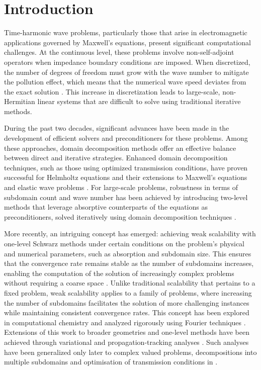 \documentclass[smallextended]{svjour3}       %
\begin{document}
\maketitle

\section{Introduction}
Time-harmonic wave problems, particularly those that arise in electromagnetic applications governed by Maxwell’s equations, present significant computational challenges. At the continuous level, these problems involve non-self-adjoint operators when impedance boundary conditions are imposed. When discretized, the number of degrees of freedom must grow with the wave number to mitigate the pollution effect, which means that the numerical wave speed deviates from the exact solution \cite{Babuska:1997:IPE}. This increase in discretization leads to large-scale, non-Hermitian linear systems that are difficult to solve using traditional iterative methods.

During the past two decades, significant advances have been made in the development of efficient solvers and preconditioners for these problems. Among these approaches, domain decomposition methods \cite{Dolean:15:DDM} offer an effective balance between direct and iterative strategies. Enhanced domain decomposition techniques, such as those using optimized transmission conditions, have proven successful for Helmholtz equations \cite{Gander:2007:OSM} and their extensions to Maxwell’s equations \cite{Dolean:2015:ETC,Dolean:09:OSM,ElBouajaji:12:OSM} and elastic wave problems \cite{Brunet:2019:NDD,Mattesi:2019:ABC}. For large-scale problems, robustness in terms of subdomain count and wave number has been achieved by introducing two-level methods that leverage absorptive counterparts of the equations as preconditioners, solved iteratively using domain decomposition techniques \cite{Bonazzoli:2019:ADD,Dolean:2020:IFD,Graham:2017:RRD}.

More recently, an intriguing concept has emerged: achieving weak scalability with one-level Schwarz methods under certain conditions on the problem’s physical and numerical parameters, such as absorption and subdomain size. This ensures that the convergence rate remains stable as the number of subdomains increases, enabling {the computation of} the solution of increasingly complex problems without requiring a coarse space \cite{Gong:2020:DDP,Graham:2020:DDI}. Unlike traditional scalability that pertains to a fixed problem, weak scalability applies to a family of problems, where increasing the number of subdomains facilitates the solution of more challenging instances while maintaining consistent convergence rates. This concept has been explored in computational chemistry \cite{Cances:2013:DDI} and analyzed rigorously using Fourier techniques \cite{Ciaramella:2017:APS}. Extensions of this work to broader geometries and one-level methods have been achieved through variational and propagation-tracking analyses \cite{Ciaramella:2020:OSS}. Such analyses have been generalized only later to complex valued problems, decompositions into multiple subdomains and optimisation of transmission conditions in \cite{Dolean:2023:CFO,Dolean:2020:IFD,Gander:2024:ASM}. 
\end{document}
